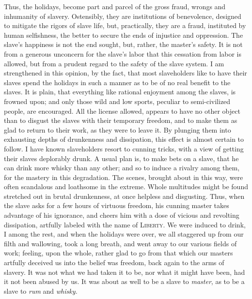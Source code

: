 Thus, the holidays, become part and parcel of the gross fraud, wrongs
and inhumanity of slavery. Ostensibly, they are institutions of
benevolence, designed to mitigate the rigors of slave life, but,
practically, they are a fraud, instituted by human selfishness, the
better to secure the ends of injustice and oppression. The slave's
happiness is not the end sought, but, rather, the master's safety. It is
not from a generous unconcern for the slave's labor that this cessation
from labor is allowed, but from a prudent regard to the
{\protect\hypertarget{255}{}{}}safety of the slave system. I am
strengthened in this opinion, by the fact, that most slaveholders like
to have their slaves spend the holidays in such a manner as to be of no
real benefit to the slaves. It is plain, that everything like rational
enjoyment among the slaves, is frowned upon; and only those wild and low
sports, peculiar to semi-civilized people, are encouraged. All the
license allowed, appears to have no other object than to disgust the
slaves with their temporary freedom, and to make them as glad to return
to their work, as they were to leave it. By plunging them into
exhausting depths of drunkenness and dissipation, this effect is almost
certain to follow. I have known slaveholders resort to cunning tricks,
with a view of getting their slaves deplorably drunk. A usual plan is,
to make bets on a slave, that he can drink more whisky than any other;
and so to induce a rivalry among them, for the mastery in this
degradation. The scenes, brought about in this way, were often
scandalous and loathsome in the extreme. Whole multitudes might be found
stretched out in brutal drunkenness, at once helpless and disgusting.
Thus, when the slave asks for a few hours of virtuous freedom, his
cunning master takes advantage of his ignorance, and cheers him with a
dose of vicious and revolting dissipation, artfully labeled with the
name of \textsc{Liberty}. We were induced to drink, I among the rest,
and when the holidays were over, we all staggered up from our filth and
wallowing, took a long breath, and went away to our various fields of
work; feeling, upon the whole, rather glad to go from that which our
masters artfully deceived us into the belief was
{\protect\hypertarget{256}{}{}}freedom, back again to the arms of
slavery. It was not what we had taken it to be, nor what it might have
been, had it not been abused by us. It was about as well to be a slave
to \emph{master}, as to be a slave to \emph{rum} and \emph{whisky.}

